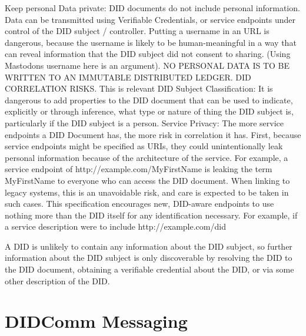 Keep personal Data private: DID documents do not include personal information. 
Data can be transmitted using Verifiable Credentials, or service endpoints under control of the DID subject / controller. 
Putting a username in an URL is dangerous, because the username is likely to be human-meaningful in a way that can reveal information that the DID subject did not consent to sharing.  (Using Mastodons username here is an argument). 
NO PERSONAL DATA IS TO BE WRITTEN TO AN IMMUTABLE DISTRIBUTED LEDGER.
DID CORRELATION RISKS. This is relevant
DID Subject Classification: It is dangerous to add properties to the DID document that can be used to indicate, explicitly or through inference, what type or nature of thing the DID subject is, particularly if the DID subject is a person.
Service Privacy: The more service endpoints a DID Document has, the more risk in correlation it has. 
First, because service endpoints might be specified as URIs, they could unintentionally leak personal information because of the architecture of the service. For example, a service endpoint of http://example.com/MyFirstName is leaking the term MyFirstName to everyone who can access the DID document. When linking to legacy systems, this is an unavoidable risk, and care is expected to be taken in such cases. This specification encourages new, DID-aware endpoints to use nothing more than the DID itself for any identification necessary. For example, if a service description were to include http://example.com/did%





 A DID is unlikely to contain any information about the DID subject, so further information about the DID subject is only discoverable by resolving the DID to the DID document, obtaining a verifiable credential about the DID, or via some other description of the DID.



\section{DIDComm Messaging}

